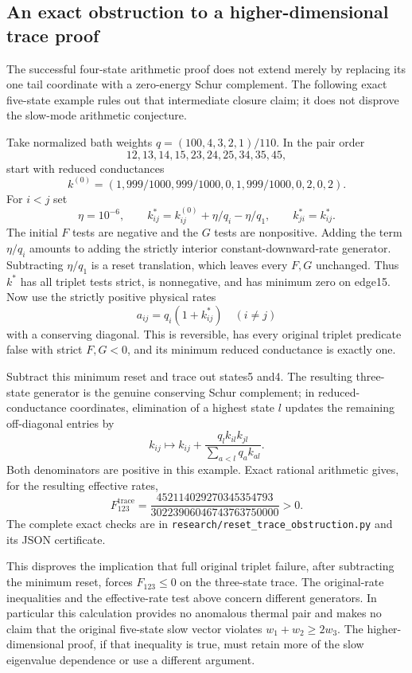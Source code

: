 \subsection{An exact obstruction to a higher-dimensional trace proof}
\label{sec:resettraceobstruction}
The successful four-state arithmetic proof does not extend merely by
replacing its one tail coordinate with a zero-energy Schur complement.
The following exact five-state example rules out that intermediate
closure claim; it does not disprove the slow-mode arithmetic conjecture.

Take normalized bath weights $q=(100,4,3,2,1)/110$.
In the pair order
\[
12,13,14,15,23,24,25,34,35,45,
\]
start with reduced conductances
\[
k^{(0)}=(1,999/1000,999/1000,0,1,999/1000,0,2,0,2).
\]
For $i<j$ set
\[
\eta=10^{-6},\qquad
k^*_{ij}=k^{(0)}_{ij}+\eta/q_i-\eta/q_1,
\qquad k^*_{ji}=k^*_{ij}.
\]
The initial $F$ tests are negative and the $G$ tests are nonpositive.
Adding the term $\eta/q_i$ amounts to adding the strictly interior
constant-downward-rate generator. Subtracting $\eta/q_1$ is a reset
translation, which leaves every $F,G$ unchanged. Thus $k^*$ has all
triplet tests strict, is nonnegative, and has minimum zero on edge15.
Now use the strictly positive physical rates
\[
a_{ij}=q_i(1+k^*_{ij})\quad(i\ne j)
\]
with a conserving diagonal. This is reversible, has every original
triplet predicate false with strict $F,G<0$, and its minimum reduced
conductance is exactly one.

Subtract this minimum reset and trace out states5 and4. The resulting
three-state generator is the genuine conserving Schur complement; in
reduced-conductance coordinates, elimination of a highest state $l$
updates the remaining off-diagonal entries by
\[
k_{ij}\longmapsto k_{ij}
 +\frac{q_l k_{il}k_{jl}}{\sum_{a<l}q_a k_{al}}.
\]
Both denominators are positive in this example. Exact rational arithmetic
gives, for the resulting effective rates,
\[
F^{\mathrm{trace}}_{123}
=\frac{452114029270345354793}{30223906046743763750000}>0.
\]
The complete exact checks are in
\texttt{research/reset\_trace\_obstruction.py} and its JSON certificate.

This disproves the implication that full original triplet failure,
after subtracting the minimum reset, forces $F_{123}\leq0$ on the
three-state trace. The original-rate inequalities and the effective-rate
test above concern different generators. In particular this calculation
provides no anomalous thermal pair and makes no claim that the original
five-state slow vector violates $w_1+w_2\geq2w_3$.
The higher-dimensional proof, if that inequality is true, must retain
more of the slow eigenvalue dependence or use a different argument.
